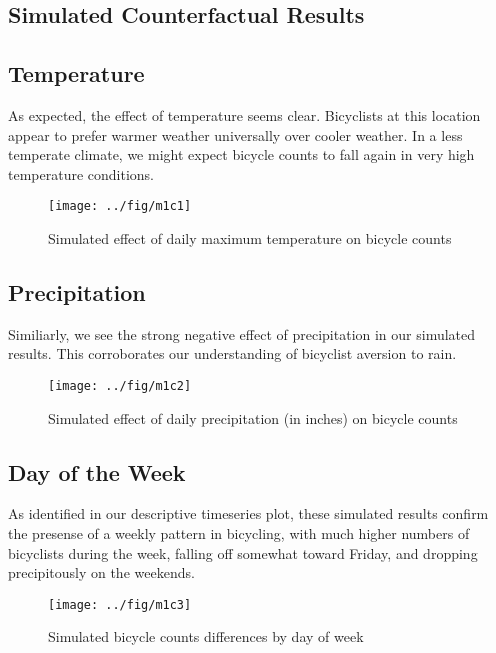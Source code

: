 \documentclass[final]{beamer}
\begin{document}
\begin{frame}[t]
\begin{multicols}{3}
\section{Simulated Counterfactual Results}

\subsection{Temperature}

As expected, the effect of temperature seems clear. Bicyclists at this
location appear to prefer warmer weather universally over cooler
weather. In a less temperate climate, we might expect bicycle counts
to fall again in very high temperature conditions.

\begin{figure}[htbp]
\begin{center}
\texttt{[image: ../fig/m1c1]}
\caption{Simulated effect of daily maximum temperature on bicycle counts}
\label{fg:temp}
\end{center}
\end{figure}


\subsection{Precipitation}
Similiarly, we see the strong negative effect of precipitation in our simulated
results. This corroborates our understanding of bicyclist aversion to rain.

\begin{figure}[htbp]
\begin{center}
\texttt{[image: ../fig/m1c2]}
\caption{Simulated effect of daily precipitation (in inches) on
  bicycle counts}
\label{fg:maxtemp}
\end{center}
\end{figure}

\subsection{Day of the Week}
As identified in our descriptive timeseries plot, these simulated
results confirm the presense of a weekly pattern in bicycling, with
much higher numbers of bicyclists during the week, falling off
somewhat toward Friday, and dropping precipitously on the weekends.
\begin{figure}[htbp]
\begin{center}
\texttt{[image: ../fig/m1c3]}
\caption{Simulated bicycle counts differences by day of week}
\label{fg:dow}
\end{center}
\end{figure}


\end{multicols}
\end{frame}
\end{document}
